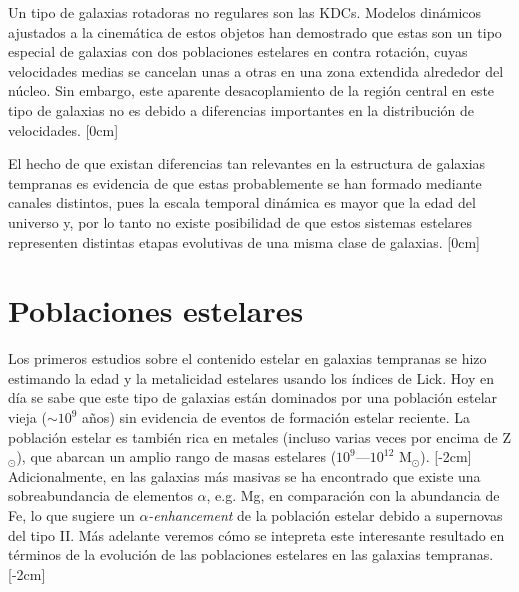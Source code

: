 \documentclass[a4paper,twoside]{article}
\begin{document}
Un tipo de galaxias rotadoras no regulares son las KDCs. Modelos dinámicos ajustados a la cinemática de estos objetos han demostrado que estas son un tipo especial de galaxias con dos poblaciones estelares en contra rotación, cuyas velocidades medias se cancelan unas a otras en una zona extendida alrededor del núcleo. Sin embargo, este aparente desacoplamiento de la región central en este tipo de galaxias no es debido a diferencias importantes en la distribución de velocidades. [0cm]

El hecho de que existan diferencias tan relevantes en la estructura de galaxias tempranas es evidencia de que estas probablemente se han formado mediante canales distintos, pues la escala temporal dinámica es mayor que la edad del universo y, por lo tanto no existe posibilidad de que estos sistemas estelares representen distintas etapas evolutivas de una misma clase de galaxias. [0cm]

\section{Poblaciones estelares}

Los primeros estudios sobre el contenido estelar en galaxias tempranas se hizo estimando la edad y la metalicidad estelares usando los índices de Lick. Hoy en día se sabe que este tipo de galaxias están dominados por una población estelar vieja ($\sim10^{9}$ años) sin evidencia de eventos de formación estelar reciente. La población estelar es también rica en metales (incluso varias veces por encima de Z${}_\odot$), que abarcan un amplio rango de masas estelares ($10^9$---$10^{12}$ M${}_\odot$). [-2cm] Adicionalmente, en las galaxias más masivas se ha encontrado que existe una sobreabundancia de elementos $\alpha$, e.g. Mg, en comparación con la abundancia de Fe, lo que sugiere un \emph{$\alpha$-enhancement} de la población estelar debido a supernovas del tipo II. Más adelante veremos cómo se intepreta este interesante resultado en términos de la evolución de las poblaciones estelares en las galaxias tempranas. [-2cm]
\end{document}
